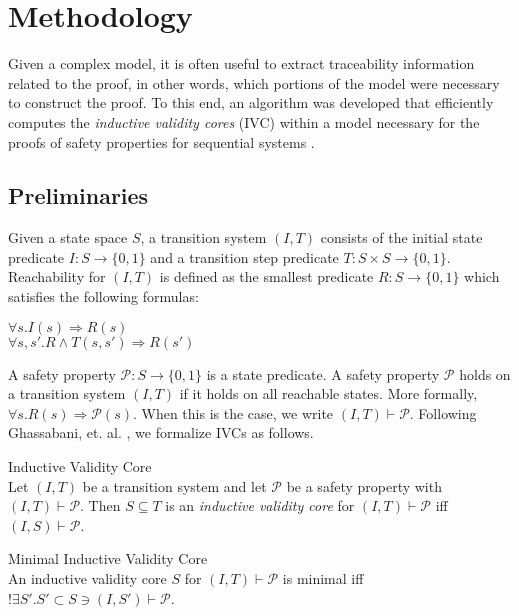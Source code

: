 \section{Methodology}
Given a complex model, it is often useful to extract traceability information related to the proof, in other words, which portions of the model were necessary to construct the proof. To this end, an algorithm was developed that efficiently computes the \textit{inductive validity cores} (IVC) within a model necessary for the proofs of safety properties for sequential systems \cite{DBLP:journals/corr/GhassabaniGW16}. 

\subsection{Preliminaries}
Given a state space $S$, a transition system $(I,T)$ consists of the initial state predicate $I : S \rightarrow \{0,1\}$ and a transition step predicate $T : S \times S \rightarrow \{0,1\}$. Reachability for $(I,T)$ is defined as the smallest predicate $R : S \rightarrow \{0,1\}$ which satisfies the following formulas:
\begin{center}
$\forall s. I(s) \Rightarrow R(s)$\\
$\forall s, s' .  R \land T(s,s') \Rightarrow R(s')$\\
\end{center}
A safety property $\mathcal{P} : S \to \{0,1\}$ is a state predicate. A safety property $\mathcal{P}$ holds on a transition system $(I,T)$ if it holds on all reachable states. More formally, $\forall s . R(s) \Rightarrow \mathcal{P}(s)$. When this is the case, we write $(I,T) \vdash\mathcal{P}$. Following Ghassabani, et. al. \cite{DBLP:journals/corr/GhassabaniGW16}, we formalize IVCs as follows.\\

\begin{definition}Inductive Validity Core\\
 Let $(I,T)$ be a transition system and let $\mathcal{P}$ be a safety property with $(I,T) \vdash \mathcal{P}$. Then $S \subseteq T$ is an \textit{inductive validity core} for $(I,T) \vdash \mathcal{P}$ iff $(I,S) \vdash\mathcal{P}$.  \\
\end{definition}

\begin{definition}Minimal Inductive Validity Core\\
An inductive validity core $S$ for $(I,T) \vdash \mathcal{P}$ is minimal iff $! \exists S' . S' \subset S \ni (I,S') \vdash \mathcal{P}$. \\
\end{definition}

